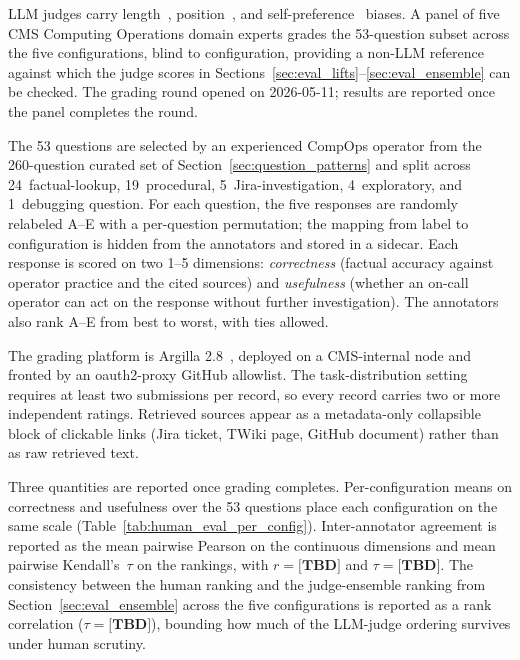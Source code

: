LLM judges carry length~\cite{hu2025lengthbias},
position~\cite{wang2023fair}, and
self-preference~\cite{panickssery2024selfpref} biases.
A panel of five CMS Computing Operations domain experts grades
the 53-question subset across the five configurations, blind to
configuration, providing a non-LLM reference against which the
judge scores in Sections~\ref{sec:eval_lifts}--\ref{sec:eval_ensemble}
can be checked. The grading round opened on 2026-05-11; results
are reported once the panel completes the round.

The 53 questions are selected by an experienced CompOps operator
from the 260-question curated set of
Section~\ref{sec:question_patterns} and split across
24~factual-lookup, 19~procedural, 5~Jira-investigation,
4~exploratory, and 1~debugging question.
For each question, the five responses are randomly relabeled
A--E with a per-question permutation; the mapping from label to
configuration is hidden from the annotators and stored in a
sidecar. Each response is scored on two 1--5 dimensions:
\emph{correctness} (factual accuracy against operator practice
and the cited sources) and \emph{usefulness} (whether an
on-call operator can act on the response without further
investigation). The annotators also rank A--E from best to
worst, with ties allowed.

The grading platform is Argilla 2.8~\cite{argilla}, deployed on
a CMS-internal node and fronted by an oauth2-proxy GitHub
allowlist. The task-distribution setting requires at least two
submissions per record, so every record carries two or more
independent ratings. Retrieved sources appear as a
metadata-only collapsible block of clickable links (Jira ticket,
TWiki page, GitHub document) rather than as raw retrieved text.

Three quantities are reported once grading completes.
Per-configuration means on correctness and usefulness over the
53 questions place each configuration on the same scale
(Table~\ref{tab:human_eval_per_config}).
Inter-annotator agreement is reported as the mean pairwise
Pearson on the continuous dimensions and mean pairwise
Kendall's~$\tau$ on the rankings, with $r = \textbf{[TBD]}$
and $\tau = \textbf{[TBD]}$. The consistency between the
human ranking and the judge-ensemble ranking from
Section~\ref{sec:eval_ensemble} across the five configurations
is reported as a rank correlation ($\tau = \textbf{[TBD]}$),
bounding how much of the LLM-judge ordering survives under
human scrutiny.

